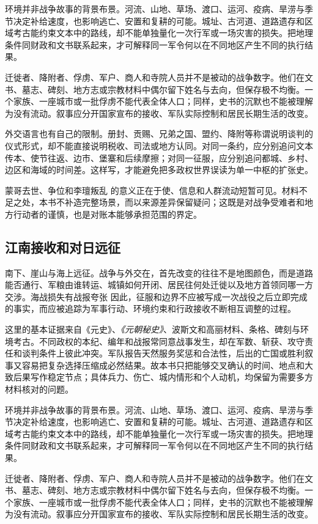 环境并非战争故事的背景布景。河流、山地、草场、渡口、运河、疫病、旱涝与季节决定补给速度，也影响逃亡、安置和复耕的可能。城址、古河道、道路遗存和区域考古能约束文本中的路线，却不能单独量化一次行军或一场灾害的损失。把地理条件同财政和文书联系起来，才可解释同一军令何以在不同地区产生不同的执行结果。

迁徙者、降附者、俘虏、军户、商人和寺院人员并不是被动的战争数字。他们在文书、墓志、碑刻、地方志或宗教材料中偶尔留下姓名与去向，但保存极不均衡。一个家族、一座城市或一批俘虏不能代表全体人口；同样，史书的沉默也不能被理解为没有流动。叙事应分开国家宣布的接收、军队实际控制和居民长期生活的改变。

外交语言也有自己的限制。册封、贡赐、兄弟之国、盟约、降附等称谓说明谈判的仪式形式，却不能直接说明税收、司法或地方认同。对同一条约，应分别追问文本传本、使节往返、边市、堡寨和后续摩擦；对同一征服，应分别追问都城、乡村、边区和海域的时间差。这样写，才能避免把多政权世界误读为单一中枢的扩张史。

蒙哥去世、争位和李璮叛乱 的意义正在于使、信息和人群流动短暂可见。材料不足之处，本书不补造完整场景，而以来源差异保留疑问；这既是对战争受难者和地方行动者的谨慎，也是对账本能够承担范围的界定。

\subsection{江南接收和对日远征}

南下、崖山与海上远征。战争与外交在，首先改变的往往不是地图颜色，而是道路能否通行、军粮由谁转运、城镇如何开闭、居民往何处迁徙以及地方首领同哪一方交涉。海战损失有战报夸张 因此，征服和边界不应被写成一次战役之后立即完成的事实，而应被追踪为军事行动、环境约束和行政接收不断相互调整的过程。

这里的基本证据来自《元史》、\textit{《元朝秘史》}、波斯文和高丽材料、条格、碑刻与环境考古。不同政权的本纪、编年和战报常同意战事发生，却在军数、斩获、攻守责任和谈判条件上彼此冲突。军队报告天然服务奖惩和合法性，后出的亡国或胜利叙事又容易把复杂选择压缩成必然结果。故本书只把能够交叉确认的时间、地点和大致后果写作稳定节点；具体兵力、伤亡、城内情形和个人动机，均保留为需要多方材料核对的问题。

环境并非战争故事的背景布景。河流、山地、草场、渡口、运河、疫病、旱涝与季节决定补给速度，也影响逃亡、安置和复耕的可能。城址、古河道、道路遗存和区域考古能约束文本中的路线，却不能单独量化一次行军或一场灾害的损失。把地理条件同财政和文书联系起来，才可解释同一军令何以在不同地区产生不同的执行结果。

迁徙者、降附者、俘虏、军户、商人和寺院人员并不是被动的战争数字。他们在文书、墓志、碑刻、地方志或宗教材料中偶尔留下姓名与去向，但保存极不均衡。一个家族、一座城市或一批俘虏不能代表全体人口；同样，史书的沉默也不能被理解为没有流动。叙事应分开国家宣布的接收、军队实际控制和居民长期生活的改变。

